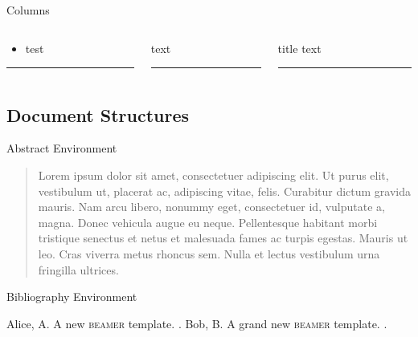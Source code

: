 \begin{frame}[t]{Columns}
  \begin{columns}[onlytextwidth,t]
    \begin{column}{.3\textwidth}
      \vbox{}\par\nointerlineskip
      \begin{itemize}
        \item test
      \end{itemize}
      \rule{\linewidth}{2pt}
    \end{column}
    \begin{column}{.3\textwidth}
      \vbox{}\par\nointerlineskip
      text
      \rule{\linewidth}{2pt}
    \end{column}
    \begin{column}{.3\textwidth}
      \vbox{}\par\nointerlineskip
      \begin{block}{title}
        text
      \end{block}
      \rule{\linewidth}{2pt}
    \end{column}
  \end{columns}
\end{frame}

\subsection{Document Structures}

\begin{frame}{Abstract Environment}
\begin{abstract}
  Lorem ipsum dolor sit amet, consectetuer
  adipiscing elit. Ut purus elit, vestibulum ut, placerat ac,
  adipiscing vitae, felis. Curabitur dictum gravida mauris. Nam arcu
  libero, nonummy eget, consectetuer id, vulputate a, magna. Donec
  vehicula augue eu neque. Pellentesque habitant morbi tristique
  senectus et netus et malesuada fames ac turpis egestas. Mauris ut
  leo. Cras viverra metus rhoncus sem. Nulla et lectus vestibulum urna
  fringilla ultrices.
\end{abstract}
\end{frame}

\begin{frame}{Bibliography Environment}
\begin{thebibliography}{10}
  Alice, A. \newblock A new \textsc{beamer} template.  .
  Bob, B. \newblock A grand new \textsc{beamer} template.  .
\end{thebibliography}
\end{frame}

